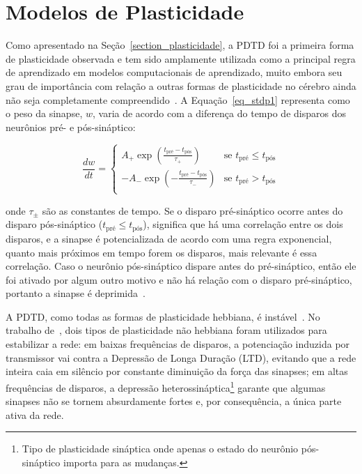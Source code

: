 \section{Modelos de Plasticidade}\label{section_modelos_plasticidade} 

Como apresentado na Seção~\ref{section_plasticidade}, a PDTD foi a primeira forma de plasticidade observada e tem sido amplamente
utilizada como a principal regra de aprendizado em modelos computacionais de aprendizado, muito embora seu grau de importância com
relação a outras formas de plasticidade no cérebro ainda não seja completamente compreendido~\cite{feldmanSpike2020}. A
Equação~\ref{eq_stdp1} representa como o peso da sinapse, $w$, varia de acordo com a diferença do tempo de disparos dos neurônios
pré- e pós-sináptico:

\begin{equation}
\label{eq_stdp1}
\frac{dw}{dt} = 
\begin{cases}
      A_{+} \exp(\frac{t_{\text{pré}} - t_{\text{pós}}}{\tau_{+}}) & \text{se $t_{\text{pré}} \le t_{\text{pós}}$}\\
      -A_{-} \exp(-\frac{t_{\text{pré}} - t_{\text{pós}}}{\tau_{-}}) & \text{se $t_{\text{pré}} > t_{\text{pós}}$}\\
\end{cases}
\end{equation}

\noindent{}onde $\tau_{\pm}$ são as constantes de tempo. Se o disparo pré-sináptico ocorre antes do disparo pós-sináptico ($t_{\text{pré}}
\le t_{\text{pós}}$), significa que há uma correlação entre os dois disparos, e a sinapse é potencializada de acordo com uma regra
exponencial, quanto mais próximos em tempo forem os disparos, mais relevante é essa correlação. Caso o neurônio pós-sináptico
dispare antes do pré-sináptico, então ele foi ativado por algum outro motivo e não há relação com o disparo pré-sináptico,
portanto a sinapse é deprimida~\cite{yamazakiSpiking2022}.

A PDTD, como todas as formas de plasticidade hebbiana, é instável~\cite{gerstnerSpiking2002}. No trabalho
de~\cite{zenkeDiverse2015}, dois tipos de plasticidade não hebbiana foram utilizados para estabilizar a rede: em baixas
frequências de disparos, a potenciação induzida por transmissor vai contra a Depressão de Longa Duração (LTD), evitando que a rede
inteira caia em silêncio por constante diminuição da força das sinapses; em altas frequências de disparos, a depressão
heterossináptica\footnote{Tipo de plasticidade sináptica onde apenas o estado do neurônio pós-sináptico importa para as mudanças.}
garante que algumas sinapses não se tornem absurdamente fortes e, por consequência, a única parte ativa da rede.

